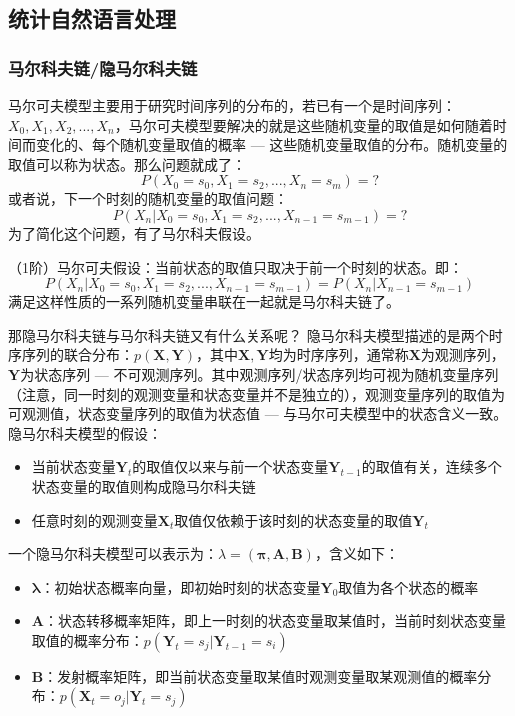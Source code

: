 \subsection{统计自然语言处理}
\subsubsection{马尔科夫链/隐马尔科夫链}
马尔可夫模型主要用于研究时间序列的分布的，若已有一个是时间序列：$X_0, X_1, X_2, ..., X_n$，马尔可夫模型要解决的就是这些随机变量的取值是如何随着时间而变化的、每个随机变量取值的概率 --- 这些随机变量取值的分布。随机变量的取值可以称为状态。那么问题就成了：
$$
P(X_0=s_0, X_1=s_2, ..., X_n=s_m) = ?
$$
或者说，下一个时刻的随机变量的取值问题：
$$
P(X_n | X_0=s_0, X_1=s_2, ..., X_{n-1}=s_{m-1}) = ?
$$
为了简化这个问题，有了马尔科夫假设。

（1阶）马尔可夫假设：当前状态的取值只取决于前一个时刻的状态。即：
$$
P(X_n | X_0=s_0, X_1=s_2, ..., X_{n-1}=s_{m-1}) = P(X_n | X_{n-1}=s_{m-1})
$$
满足这样性质的一系列随机变量串联在一起就是马尔科夫链了。

那隐马尔科夫链与马尔科夫链又有什么关系呢？
隐马尔科夫模型描述的是两个时序序列的联合分布：$p( \boldsymbol{X}, \boldsymbol{Y} )$，其中$\boldsymbol{X}, \boldsymbol{Y}$均为时序序列，通常称$\boldsymbol{X}$为观测序列，$\boldsymbol{Y}$为状态序列 --- 不可观测序列。其中观测序列/状态序列均可视为随机变量序列（注意，同一时刻的观测变量和状态变量并不是独立的），观测变量序列的取值为可观测值，状态变量序列的取值为状态值 --- 与马尔可夫模型中的状态含义一致。隐马尔科夫模型的假设：
\begin{itemize}
	\item 当前状态变量$\boldsymbol{Y}_t$的取值仅以来与前一个状态变量$\boldsymbol{Y}_{t-1}$的取值有关，连续多个状态变量的取值则构成隐马尔科夫链
	\item 任意时刻的观测变量$\boldsymbol{X}_t$取值仅依赖于该时刻的状态变量的取值$\boldsymbol{Y}_t$
\end{itemize}

一个隐马尔科夫模型可以表示为：$\lambda = (\boldsymbol{\pi}, \boldsymbol{A}, \boldsymbol{B})$，含义如下：
\begin{itemize}
	\item $\boldsymbol{\lambda}$：初始状态概率向量，即初始时刻的状态变量$\boldsymbol{Y}_0$取值为各个状态的概率
	\item $\boldsymbol{A}$：状态转移概率矩阵，即上一时刻的状态变量取某值时，当前时刻状态变量取值的概率分布：$p(\boldsymbol{Y}_t=s_j | \boldsymbol{Y}_{t-1}=s_i)$
	\item $\boldsymbol{B}$：发射概率矩阵，即当前状态变量取某值时观测变量取某观测值的概率分布：$p(\boldsymbol{X}_t=o_j | \boldsymbol{Y}_t=s_j)$
\end{itemize}

